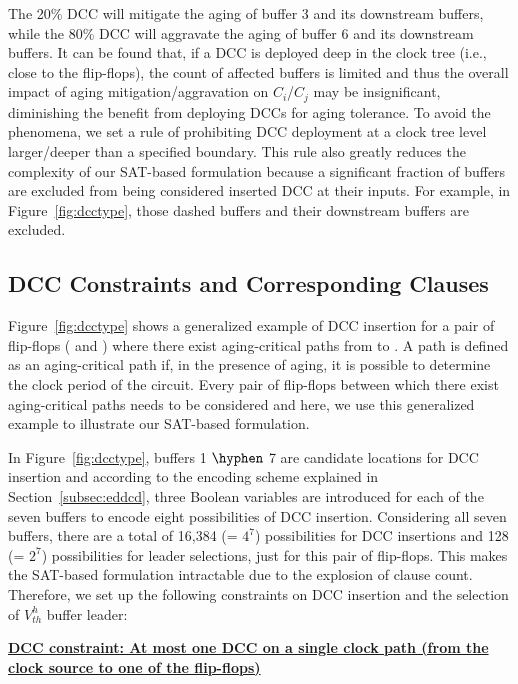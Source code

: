The 20\% DCC will mitigate the aging of buffer 3 and its downstream buffers, while the 80\% DCC will aggravate the aging of buffer 6 and its downstream buffers. It can be found that, if a DCC is deployed deep in the clock tree (i.e., close to the flip-flops), the count of affected buffers is limited and thus the overall impact of aging mitigation/aggravation on $C_i$/$C_j$ may be insignificant, diminishing the benefit from deploying DCCs for aging tolerance.  To avoid the phenomena, we set a rule of prohibiting DCC deployment at a clock tree level larger/deeper than a specified boundary. This rule also greatly reduces the complexity of our SAT-based formulation because a significant fraction of buffers are excluded from being considered inserted DCC at their inputs. For example, in Figure~\ref{fig:dcctype}, those dashed buffers and their downstream buffers are excluded. 

\subsection{DCC Constraints and Corresponding Clauses}
\label{subsec:dccccc}

Figure~\ref{fig:dcctype} shows a generalized example of DCC insertion for a pair of flip-flops ( and ) where there exist aging-critical paths from  to . A path is defined as an aging-critical path if, in the presence of aging, it is possible to determine the clock period of the circuit. Every pair of flip-flops between which there exist aging-critical paths needs to be considered and here, we use this generalized example to illustrate our SAT-based formulation.

In Figure~\ref{fig:dcctype}, buffers 1 $\hyphen$ 7 are candidate locations for DCC insertion and according to the encoding scheme explained in Section~\ref{subsec:eddcd}, three Boolean variables are introduced for each of the seven buffers to encode eight possibilities of DCC insertion. Considering all seven buffers, there are a total of 16,384 (= $4^7$) possibilities for DCC insertions and 128 (= $2^7$) possibilities for leader selections, just for this pair of flip-flops. This makes the SAT-based formulation intractable due to the explosion of clause count. Therefore, we set up the following constraints on DCC insertion and the selection of $V_{th}^h$ buffer leader: 

{\noindent \textbf{\uline{DCC constraint: At most one DCC on a single clock path (from the clock source to one of the flip-flops)}}}

